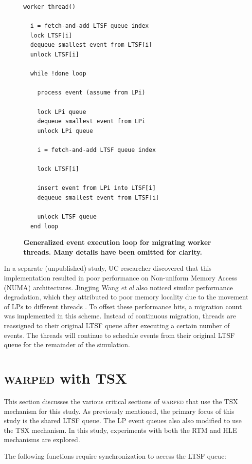 \documentclass{sig-alternate}
\begin{document}
\begin{figure}
\begin{verbatim}
worker_thread()

  i = fetch-and-add LTSF queue index
  lock LTSF[i]
  dequeue smallest event from LTSF[i]
  unlock LTSF[i]

  while !done loop

    process event (assume from LPi)

    lock LPi queue
    dequeue smallest event from LPi
    unlock LPi queue

    i = fetch-and-add LTSF queue index

    lock LTSF[i]

    insert event from LPi into LTSF[i]
    dequeue smallest event from LTSF[i]

    unlock LTSF queue
  end loop
\end{verbatim}
\caption{\textbf{Generalized event execution loop for migrating worker threads.  Many
    details have been omitted for clarity.}}\label{migratinWorkerThreadAlgorithm}
\end{figure}

In a separate (unpublished) study, UC researcher discovered that this implementation
resulted in poor performance on Non-uniform Memory Access (NUMA) architectures.  Jingjing
Wang \emph{et al} also noticed similar performance degradation, which they attributed to
poor memory locality due to the movement of LPs to different threads \cite{numa}.  To
offset these performance hits, a migration count was implemented in this scheme.  Instead
of continuous migration, threads are reassigned to their original LTSF queue after
executing a certain number of events.  The threads will continue to schedule events from
their original LTSF queue for the remainder of the simulation.

\section{\textsc{warped} with TSX}\label{tsx}

This section discusses the various critical sections of \textsc{warped} that use the TSX
mechanism for this study.  As previously mentioned, the primary focus of this study is the
shared LTSF queue.  The LP event queues also also modified to use the TSX mechanism.  In
this study, experiments with both the RTM and HLE mechanisms are explored.

The following functions require synchronization to access the LTSF queue:
\end{document}
